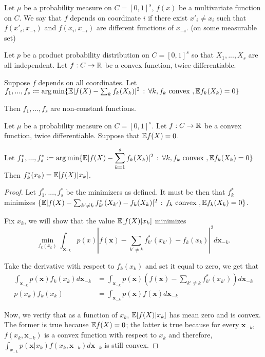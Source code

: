 \documentclass{article}
\begin{document}
Let $\mu$ be a probability measure on $C=[0,1]^s$, $f(x)$ be a multivariate function on $C$. We say that $f$ depends on coordinate $i$ if there exist $x'_i \neq x_i$ such that $f(x'_i, x_{-i})$ and $f(x_i, x_{-i})$ are different functions of $x_{-i}$. (on some measurable set)

\begin{theorem}
Let $p$ be a product probability distribution on $C=[0,1]^s$ so that $X_1,...,X_s$ are all independent. Let $f: C \rightarrow \mathbb{R}$ be a convex function, twice differentiable.

Suppose $f$ depends on all coordinates. Let $f_1,...,f_s \coloneqq \arg\min \{ \mathbb{E} | f(X) - \sum_k f_k(X_k) |^2 \,:\, \forall k, f_k \textrm{ convex }, \mathbb{E} f_k(X_k) = 0\}$
 
 Then $f_1,...,f_s$ are non-constant functions.
 \end{theorem}

 
 \begin{lemma}
\label{lem:int_reduction}
Let $\mu$ be a probability measure on $C=[0,1]^s$. Let $f: C \rightarrow \mathbb{R}$ be a convex function, twice differentiable. Suppose that $\mathbb{E} f(X) = 0$.

Let $\displaystyle f^*_1,...,f^*_s \coloneqq \arg\min \{ \mathbb{E} | f(X) - \sum_{k=1}^s f_k(X_k) |^2 \,:\, \forall k, f_k \textrm{ convex }, \mathbb{E} f_k(X_k) = 0\}$ \\

Then $f^*_k(x_k) = \mathbb{E}[ f(X) | x_k]$.
\end{lemma}
 
 \begin{proof}
 
Let $f^*_1,...,f^*_s$ be the minimizers as defined. It must be then that $f^*_k$ minimizes $\{ \mathbb{E} | f(X) - \sum_{k' \neq k} f^*_{k'} (X_{k'}) - f_k (X_k)|^2 \,:\, f_k \textrm{ convex }, \mathbb{E} f_k(X_k) = 0 \}$.

Fix $x_k$, we will show that the value $\mathbb{E}[ f(X) | x_k]$ minimizes 
\[
\min_{ f_k(x_k) } \int_{\mathbf{x}_{-k}} p(x) | f(\mathbf{x}) - \sum_{k' \neq k} f^*_{k'} (x_{k'}) - f_k (x_k)|^2 d \mathbf{x}_{-k}.
\]

Take the derivative with respect to $f_k(x_k)$ and set it equal to zero, we get that
\begin{align*}
\int_{\mathbf{x}_{-k}} p(\mathbf{x}) f_k(x_k) d \mathbf{x}_{-k} &= \int_{\mathbf{x}_{-k}} p(\mathbf{x}) ( f(\mathbf{x}) - \sum_{k' \neq k} f^*_{k'} (x_{k'}) ) d \mathbf{x}_{-k}  \\
p(x_k) f_k(x_k) &= \int_{\mathbf{x}_{-k}} p(\mathbf{x}) f(\mathbf{x}) d \mathbf{x}_{-k} 
 \end{align*}

Now, we verify that as a function of $x_k$, $\mathbb{E}[ f(X) | x_k]$ has mean zero and is convex. The former is true because $\mathbb{E} f(X) = 0$; the latter is true because for every $\mathbf{x}_{-k}$, $f(x_k, \mathbf{x}_{-k})$ is a convex function with respect to $x_k$ and therefore, $\int_{x_{-k}} p(\mathbf{x}|x_k) f(x_k, \mathbf{x}_{-k}) d \mathbf{x}_{-k}$ is still convex. 
 
 \end{proof}
 
\end{document}
